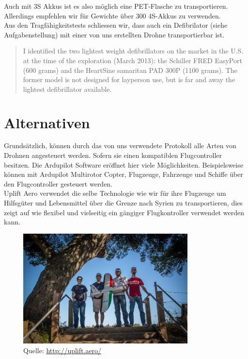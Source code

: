 Auch mit 3S Akkus ist es also möglich eine PET-Flasche zu transportieren. Allerdings empfehlen wir für Gewichte über 300 4S-Akkus zu verwenden.\\

Aus den Tragfähigkeitstests schliessen wir, dass auch ein Defibrilator (siehe Aufgabenstellung) mit einer von uns erstellten Drohne transportierbar ist.
\blockquote{I identified the two lightest weight defibrillators on the market in the U.S. at the time of the exploration (March 2013): the Schiller FRED EasyPort (600 grams) and the HeartSine samaritan PAD 300P (1100 grams). The former model is not designed for layperson use, but is far and away the lightest defibrillator available.} 
\cite[p.3]{FleckUAV}

\section{Alternativen}
Grundsätzlich, können durch das von uns verwendete  Protokoll alle Arten von Drohnen angesteuert werden. Sofern sie einen kompatiblen Flugcontroller besitzen. Die Ardupilot Software eröffnet hier viele Möglichkeiten. Beispielsweise können mit Ardupilot Multirotor Copter, Flugzeuge, Fahrzeuge und Schiffe über den Flugcontroller gesteuert werden.
\\
Uplift Aero verwendet die selbe Technologie wie wir für ihre Flugzeuge um Hilfsgüter und Lebensmittel über die Grenze nach Syrien zu transportieren, dies zeigt auf wie flexibel und vielseitig ein gängiger Flugkontroller verwendet werden kann.
\begin{figure}[H]
\centering
\includegraphics[width=0.8\textwidth] {images/SyriaUplift.jpg}
\caption{Quelle: \url{http://uplift.aero/}}
\label{fig:prototyp-1}
\end{figure}
